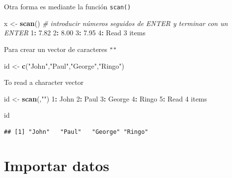 \documentclass[]{book}
\newenvironment{Shaded}{\begin{snugshade}}{\end{snugshade}}
\newcommand{\KeywordTok}[1]{\textcolor[rgb]{0.13,0.29,0.53}{\textbf{#1}}}
\newcommand{\DecValTok}[1]{\textcolor[rgb]{0.00,0.00,0.81}{#1}}
\newcommand{\FloatTok}[1]{\textcolor[rgb]{0.00,0.00,0.81}{#1}}
\newcommand{\StringTok}[1]{\textcolor[rgb]{0.31,0.60,0.02}{#1}}
\newcommand{\CommentTok}[1]{\textcolor[rgb]{0.56,0.35,0.01}{\textit{#1}}}
\newcommand{\OperatorTok}[1]{\textcolor[rgb]{0.81,0.36,0.00}{\textbf{#1}}}
\newcommand{\NormalTok}[1]{#1}
\begin{document}
Otra forma es mediante la función \texttt{scan()}

\begin{Shaded}
\begin{Highlighting}[]
\NormalTok{x <-}\StringTok{ }\KeywordTok{scan}\NormalTok{()  }\CommentTok{# introducir números seguidos de ENTER y terminar con un ENTER}
\DecValTok{1}\OperatorTok{:}\StringTok{ }\FloatTok{7.82}
\DecValTok{2}\OperatorTok{:}\StringTok{ }\FloatTok{8.00}
\DecValTok{3}\OperatorTok{:}\StringTok{ }\FloatTok{7.95}
\DecValTok{4}\OperatorTok{:}\StringTok{ }
\NormalTok{Read }\DecValTok{3}\NormalTok{ items}
\end{Highlighting}
\end{Shaded}

Para crear un vector de caracteres \texttt{""}

\begin{Shaded}
\begin{Highlighting}[]
\NormalTok{id <-}\StringTok{ }\KeywordTok{c}\NormalTok{(}\StringTok{"John"}\NormalTok{,}\StringTok{"Paul"}\NormalTok{,}\StringTok{"George"}\NormalTok{,}\StringTok{"Ringo"}\NormalTok{)}
\end{Highlighting}
\end{Shaded}

To read a character vector

\begin{Shaded}
\begin{Highlighting}[]
\NormalTok{id <-}\StringTok{ }\KeywordTok{scan}\NormalTok{(,}\StringTok{""}\NormalTok{)}
\DecValTok{1}\OperatorTok{:}\StringTok{ }\NormalTok{John}
\DecValTok{2}\OperatorTok{:}\StringTok{ }\NormalTok{Paul}
\DecValTok{3}\OperatorTok{:}\StringTok{ }\NormalTok{George}
\DecValTok{4}\OperatorTok{:}\StringTok{ }\NormalTok{Ringo}
\DecValTok{5}\OperatorTok{:}\StringTok{ }
\NormalTok{Read }\DecValTok{4}\NormalTok{ items  }
\end{Highlighting}
\end{Shaded}

\begin{Shaded}
\begin{Highlighting}[]
\NormalTok{id}
\end{Highlighting}
\end{Shaded}

\begin{verbatim}
## [1] "John"   "Paul"   "George" "Ringo"
\end{verbatim}

\section{Importar datos}\label{importar-datos}
\end{document}
